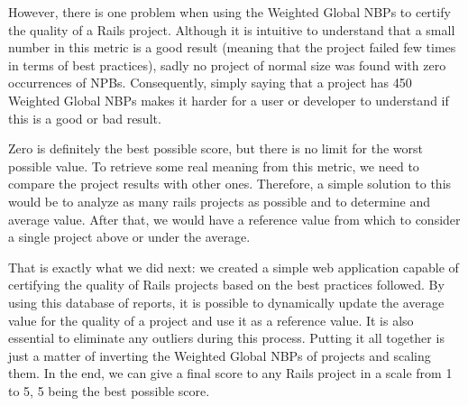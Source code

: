 However, there is one problem when using the Weighted Global NBPs to certify the quality of a Rails project. 
Although it is intuitive to understand that a small number in this metric is a good result
(meaning that the project failed few times in terms of best practices), sadly 
no project of normal size was found with zero occurrences of NPBs.
Consequently, simply saying that a project has 450 Weighted Global NBPs makes it harder for a user or developer
to understand if this is a good or bad result.

Zero is definitely the best possible score, but there is no limit for the worst possible value.
To retrieve some real meaning from this metric, we need to compare the project results with other ones.
Therefore, a simple solution to this would be to analyze as many rails projects as possible and to determine and average value.
After that, we would have a reference value from which to consider a single project above or under the average.

That is exactly what we did next: 
we created a simple web application capable of certifying the quality of Rails projects based on the best practices followed. 
By using this database of reports, it is possible to dynamically update the average value for the quality of a project 
and use it as a reference value. It is also essential to eliminate any outliers during this process. 
Putting it all together is just a matter of inverting the Weighted Global NBPs of projects and scaling them. 
In the end, we can give a final score to any Rails project in a scale from 1 to 5, 5 being the best possible score.

